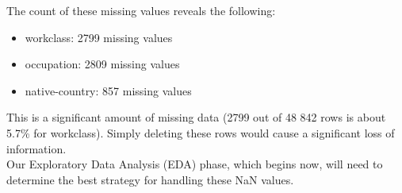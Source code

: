 The count of these missing values reveals the following:
\begin{itemize}
    \item workclass: 2799 missing values

    \item occupation: 2809 missing values

    \item native-country: 857 missing values

\end{itemize}

This is a significant amount of missing data (2799 out of 48 842 rows is about 5.7\% for workclass). Simply deleting these rows would cause a significant loss of information.\\

Our Exploratory Data Analysis (EDA) phase, which begins now, will need to determine the best strategy for handling these NaN values.